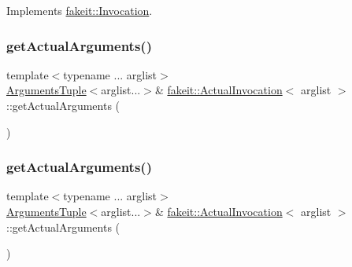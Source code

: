 Implements \mbox{\hyperlink{structfakeit_1_1Invocation_ad6bf5d7b6ae2897c5d6bbb51183b8c1d}{fakeit\+::\+Invocation}}.

\mbox{\label{structfakeit_1_1ActualInvocation_a90b32ff4f76fa609de50d72792657207}} 
\subsubsection{\texorpdfstring{getActualArguments()}{getActualArguments()}\hspace{0.1cm}{\footnotesize\ttfamily [1/9]}}
{\footnotesize\ttfamily template$<$typename ... arglist$>$ \\
\mbox{\hyperlink{namespacefakeit_a476a37a598825e1b5dd67b3a176491a1}{Arguments\+Tuple}}$<$arglist...$>$\& \mbox{\hyperlink{structfakeit_1_1ActualInvocation}{fakeit\+::\+Actual\+Invocation}}$<$ arglist $>$\+::get\+Actual\+Arguments (\begin{DoxyParamCaption}{ }\end{DoxyParamCaption})\hspace{0.3cm}{\ttfamily [inline]}}

\mbox{\label{structfakeit_1_1ActualInvocation_a90b32ff4f76fa609de50d72792657207}} 
\subsubsection{\texorpdfstring{getActualArguments()}{getActualArguments()}\hspace{0.1cm}{\footnotesize\ttfamily [2/9]}}
{\footnotesize\ttfamily template$<$typename ... arglist$>$ \\
\mbox{\hyperlink{namespacefakeit_a476a37a598825e1b5dd67b3a176491a1}{Arguments\+Tuple}}$<$arglist...$>$\& \mbox{\hyperlink{structfakeit_1_1ActualInvocation}{fakeit\+::\+Actual\+Invocation}}$<$ arglist $>$\+::get\+Actual\+Arguments (\begin{DoxyParamCaption}{ }\end{DoxyParamCaption})\hspace{0.3cm}{\ttfamily [inline]}}

